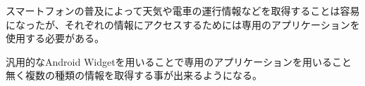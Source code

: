 


\begin{jabstract}
スマートフォンの普及によって天気や電車の運行情報などを取得することは容易になったが、それぞれの情報にアクセスするためには専用のアプリケーションを使用する必要がある。

汎用的なAndroid Widgetを用いることで専用のアプリケーションを用いること無く複数の種類の情報を取得する事が出来るようになる。

\end{jabstract}



